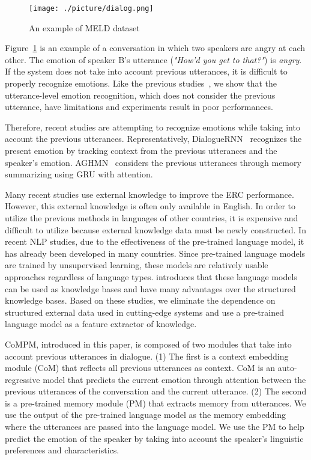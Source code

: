 \documentclass[11pt]{article}
\begin{document}
\begin{figure}[!t]
    \centering 
    \texttt{[image: ./picture/dialog.png]}
    \caption{An example of MELD dataset}
    \label{fig:dialog}
\end{figure}

Figure~\ref{fig:dialog} is an example of a conversation in which two speakers are angry at each other. The emotion of speaker B's utterance (\textit{"How'd you get to that?"}) is \textit{angry}. If the system does not take into account previous utterances, it is difficult to properly recognize emotions. Like the previous studies~\cite{ghosal-etal-2020-cosmic}, we show that the utterance-level emotion recognition, which does not consider the previous utterance, have limitations and experiments result in poor performances. 


Therefore, recent studies are attempting to recognize emotions while taking into account the previous utterances. Representatively, DialogueRNN~\cite{DialogueRNN} recognizes the present emotion by tracking context from the previous utterances and the speaker's emotion. AGHMN~\cite{JiaoLK20} considers the previous utterances through memory summarizing using GRU with attention.


Many recent studies use external knowledge to improve the ERC performance. However, this external knowledge is often only available in English. In order to utilize the previous methods in languages of other countries, it is expensive and difficult to utilize because external knowledge data must be newly constructed. In recent NLP studies, due to the effectiveness of the pre-trained language model, it has already been developed in many countries. Since pre-trained language models are trained by unsupervised learning, these models are relatively usable approaches regardless of language types. \citet{petroni-etal-2019-language} introduces that these language models can be used as knowledge bases and have many advantages over the structured knowledge bases. Based on these studies, we eliminate the dependence on structured external data used in cutting-edge systems and use a pre-trained language model as a feature extractor of knowledge.


CoMPM, introduced in this paper, is composed of two modules that take into account previous utterances in dialogue. (1) The first is a context embedding module (CoM) that reflects all previous utterances as context. CoM is an auto-regressive model that predicts the current emotion through attention between the previous utterances of the conversation and the current utterance. (2) The second is a pre-trained memory module (PM) that extracts memory from utterances. We use the output of the pre-trained language model as the memory embedding where the utterances are passed into the language model. We use the PM to help predict the emotion of the speaker by taking into account the speaker's linguistic preferences and characteristics.
\end{document}
